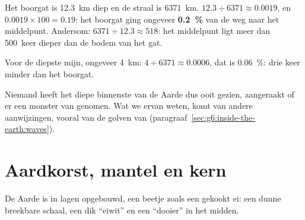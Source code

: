 \begin{example}\label{ex:g6:inside-the-earth:kola}
Het boorgat is 12.3~km diep en de straal is 6371~km.
$12.3 \div 6371 \approx 0.0019$, en $0.0019 \times 100 = 0.19$: het boorgat
ging ongeveer \textbf{0.2~\%} van de weg naar het middelpunt. Andersom:
$6371 \div 12.3 \approx 518$: het middelpunt ligt meer dan 500~keer dieper
dan de bodem van het gat.

Voor de diepste mijn, ongeveer 4~km: $4 \div 6371 \approx 0.0006$, dat is
0.06~\%: drie keer minder dan het boorgat.
\end{example}

Niemand heeft het diepe binnenste van de Aarde dus ooit gezien, aangeraakt
of er een monster van genomen. Wat we ervan weten, komt van andere
aanwijzingen, vooral van de golven van 
(paragraaf~\ref{sec:g6:inside-the-earth:waves}).

\section{Aardkorst, mantel en kern}

De Aarde is in lagen opgebouwd, een beetje zoals een gekookt ei: een dunne
breekbare schaal, een dik ``eiwit'' en een ``dooier'' in het midden.

